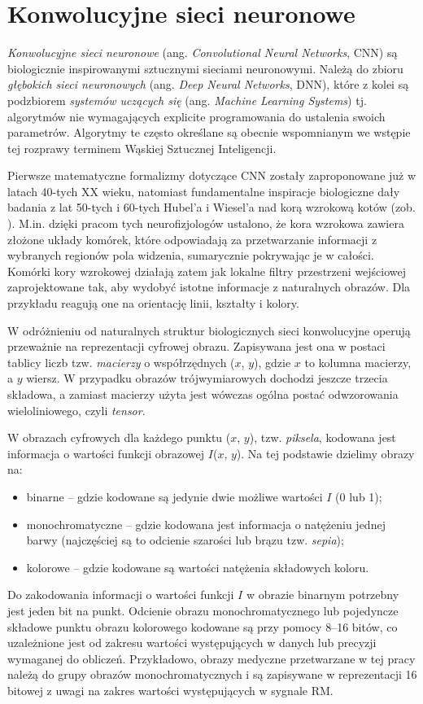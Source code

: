 \chapter{Konwolucyjne sieci neuronowe}
\label{CNNs}
\textit{Konwolucyjne sieci neuronowe} (ang. \textit{Convolutional Neural Networks}, CNN) są biologicznie inspirowanymi sztucznymi sieciami neuronowymi. Należą do zbioru \textit{głębokich sieci neuronowych} (ang. \textit{Deep Neural Networks}, DNN), które z kolei są podzbiorem \textit{systemów uczących się} (ang. \textit{Machine Learning Systems}) tj. algorytmów nie wymagających explicite programowania do ustalenia swoich parametrów. Algorytmy te często określane są obecnie wspomnianym we wstępie tej rozprawy terminem Wąskiej Sztucznej Inteligencji.

Pierwsze matematyczne formalizmy dotyczące CNN zostały zaproponowane już w latach 40-tych XX wieku, natomiast fundamentalne inspiracje biologiczne dały badania z lat 50-tych i 60-tych Hubel'a i Wiesel’a nad korą wzrokową kotów (zob. \cite{Wurtz2009}). M.in. dzięki pracom tych neurofizjologów ustalono, że kora wzrokowa zawiera złożone układy komórek, które odpowiadają za przetwarzanie informacji z wybranych regionów pola widzenia, sumarycznie pokrywając je w całości. Komórki kory wzrokowej działają zatem jak lokalne filtry przestrzeni wejściowej zaprojektowane tak, aby wydobyć istotne informacje z naturalnych obrazów. Dla przykładu reagują one na orientację linii, kształty i kolory.

W odróżnieniu od naturalnych struktur biologicznych sieci konwolucyjne operują przeważnie na reprezentacji cyfrowej obrazu. Zapisywana jest ona w postaci tablicy liczb tzw. \textit{macierzy} o współrzędnych ($x$, $y$), gdzie $x$ to kolumna macierzy, a $y$ wiersz. W przypadku obrazów trójwymiarowych dochodzi jeszcze trzecia składowa, a zamiast macierzy użyta jest wówczas ogólna postać odwzorowania wieloliniowego, czyli \textit{tensor}.

W obrazach cyfrowych dla każdego punktu ($x$, $y$), tzw. \textit{piksela}, kodowana jest informacja o wartości funkcji obrazowej $I$($x$, $y$). Na tej podstawie dzielimy obrazy na:
\begin{itemize}[noitemsep,nolistsep]
	\item binarne – gdzie kodowane są jedynie dwie możliwe wartości $I$ (0 lub 1);
	\item monochromatyczne – gdzie kodowana jest informacja o natężeniu jednej barwy (najczęściej są to odcienie szarości lub brązu tzw. \textit{sepia});
	\item kolorowe – gdzie kodowane są wartości natężenia składowych koloru.
\end{itemize}
Do zakodowania informacji o wartości funkcji $I$ w obrazie binarnym potrzebny jest jeden bit na punkt. Odcienie obrazu monochromatycznego lub pojedyncze składowe punktu obrazu kolorowego kodowane są przy pomocy 8--16 bitów, co uzależnione jest od zakresu wartości występujących w danych lub precyzji wymaganej do obliczeń. Przykładowo, obrazy medyczne przetwarzane w tej pracy należą do grupy obrazów monochromatycznych i są zapisywane w reprezentacji 16 bitowej z uwagi na zakres wartości występujących w sygnale RM.

